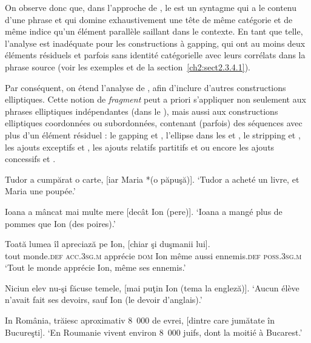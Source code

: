 On observe donc que, dans l’approche de \citet{GinzburgEtAl2000}, le  est un syntagme qui a le contenu d’une phrase et qui domine exhaustivement une tête de même catégorie et de même indice qu’un élément parallèle saillant dans le contexte. En tant que telle, l’analyse est inadéquate pour les constructions à gapping, qui ont au moins deux éléments résiduels et parfois sans identité catégorielle avec leurs corrélats dans la phrase source (voir les exemples  et  de la section~\ref{ch2:sect2.3.4.1}).   

Par conséquent, on étend l’analyse de \citet{GinzburgEtAl2000}, afin d’inclure d’autres constructions elliptiques. Cette notion de \textit{fragment} peut a priori s’appliquer non seulement aux phrases elliptiques indépendantes (dans le ), mais aussi aux constructions elliptiques coordonnées ou subordonnées, contenant (parfois) des séquences avec plus d’un élément résiduel : le gapping  et , l’ellipse dans les   et , le stripping  et , les ajouts exceptifs  et , les ajouts relatifs partitifs  et  ou encore les ajouts concessifs  et . 

\largerpage

\ea \label{ch2:ex269}
\ea Tudor a cumpărat o carte, [iar Maria *(o păpuşă)]. \label{ch2:ex269a}
\glt ‘Tudor a acheté un livre, et Maria une poupée.’

\ex Ioana a mâncat mai multe mere [decât Ion (pere)]. \label{ch2:ex269b}
\glt ‘Ioana a mangé plus de pommes que Ion (des poires).’  

\ex 
\gll Toată  lumea  îl  apreciază  pe  Ion,  [chiar  şi  duşmanii  lui]. \label{ch2:ex269c}\\
tout  monde.\textsc{def} \textsc{acc.3sg.m} apprécie  \textsc{dom}  Ion  même  aussi  ennemis.\textsc{def} \textsc{poss.3sg.m}\\
\glt ‘Tout le monde apprécie Ion, même ses ennemis.’  

\ex Niciun elev nu-şi făcuse temele, [mai puţin Ion (tema la engleză)]. \label{ch2:ex269d}
\glt ‘Aucun élève n’avait fait ses devoirs, sauf Ion (le devoir d’anglais).’  

\ex In România, trăiesc aproximativ 8~000 de evrei, [dintre care jumătate în Bucureşti]. \label{ch2:ex269e}
\glt ‘En Roumanie vivent environ 8~000 juifs, dont la moitié à Bucarest.’  

